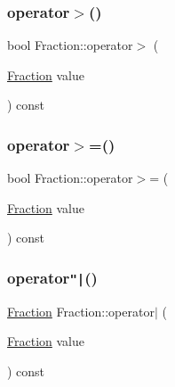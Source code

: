 \hypertarget{class_fraction_a110a04c675b4737f09e6b84236f3d8e6}{}\label{class_fraction_a110a04c675b4737f09e6b84236f3d8e6} 
\subsubsection{\texorpdfstring{operator$>$()}{operator>()}}
{\footnotesize\ttfamily bool Fraction\+::operator$>$ (\begin{DoxyParamCaption}\item[{\hyperlink{class_fraction}{Fraction}}]{value }\end{DoxyParamCaption}) const}

\hypertarget{class_fraction_a2fc5da88a8106c34bd15a472c58cd61c}{}\label{class_fraction_a2fc5da88a8106c34bd15a472c58cd61c} 
\subsubsection{\texorpdfstring{operator$>$=()}{operator>=()}}
{\footnotesize\ttfamily bool Fraction\+::operator$>$= (\begin{DoxyParamCaption}\item[{\hyperlink{class_fraction}{Fraction}}]{value }\end{DoxyParamCaption}) const}

\hypertarget{class_fraction_a41a3516a3b2d8c431ea8a17a033f48a9}{}\label{class_fraction_a41a3516a3b2d8c431ea8a17a033f48a9} 
\subsubsection{\texorpdfstring{operator\texttt{"|}()}{operator|()}}
{\footnotesize\ttfamily \hyperlink{class_fraction}{Fraction} Fraction\+::operator$\vert$ (\begin{DoxyParamCaption}\item[{\hyperlink{class_fraction}{Fraction}}]{value }\end{DoxyParamCaption}) const}

\hypertarget{class_fraction_a13da35dc2c6c3bee73c749192a61df8a}{}\label{class_fraction_a13da35dc2c6c3bee73c749192a61df8a} 
